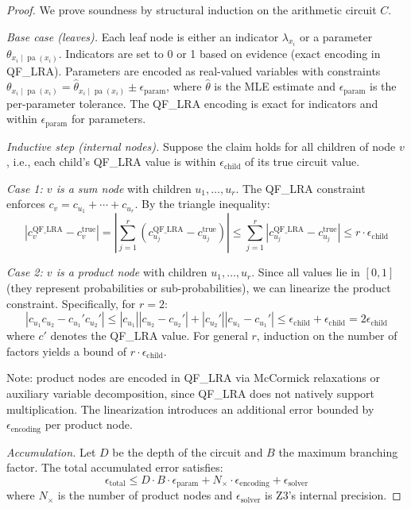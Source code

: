 \documentclass[11pt]{article}
\DeclareMathOperator{\pa}{pa}
\begin{document}
\begin{proof}
We prove soundness by structural induction on the arithmetic circuit $C$.

\emph{Base case (leaves).}
Each leaf node is either an indicator $\lambda_{x_i}$ or a parameter $\theta_{x_i \mid \pa(x_i)}$.
Indicators are set to 0 or 1 based on evidence (exact encoding in QF\_LRA).
Parameters are encoded as real-valued variables with constraints $\theta_{x_i \mid \pa(x_i)} = \hat{\theta}_{x_i \mid \pa(x_i)} \pm \epsilon_{\text{param}}$, where $\hat{\theta}$ is the MLE estimate and $\epsilon_{\text{param}}$ is the per-parameter tolerance.
The QF\_LRA encoding is exact for indicators and within $\epsilon_{\text{param}}$ for parameters.

\emph{Inductive step (internal nodes).}
Suppose the claim holds for all children of node $v$, i.e., each child's QF\_LRA value is within $\epsilon_{\text{child}}$ of its true circuit value.

\emph{Case 1: $v$ is a sum node} with children $u_1, \ldots, u_r$.
The QF\_LRA constraint enforces $c_v = c_{u_1} + \cdots + c_{u_r}$.
By the triangle inequality:
\[
  |c_v^{\text{QF\_LRA}} - c_v^{\text{true}}| = \left|\sum_{j=1}^r (c_{u_j}^{\text{QF\_LRA}} - c_{u_j}^{\text{true}})\right| \leq \sum_{j=1}^r |c_{u_j}^{\text{QF\_LRA}} - c_{u_j}^{\text{true}}| \leq r \cdot \epsilon_{\text{child}}
\]

\emph{Case 2: $v$ is a product node} with children $u_1, \ldots, u_r$.
Since all values lie in $[0,1]$ (they represent probabilities or sub-probabilities), we can linearize the product constraint.
Specifically, for $r = 2$:
\[
  |c_{u_1} c_{u_2} - c_{u_1}' c_{u_2}'| \leq |c_{u_1}||c_{u_2} - c_{u_2}'| + |c_{u_2}'||c_{u_1} - c_{u_1}'| \leq \epsilon_{\text{child}} + \epsilon_{\text{child}} = 2\epsilon_{\text{child}}
\]
where $c' $ denotes the QF\_LRA value.
For general $r$, induction on the number of factors yields a bound of $r \cdot \epsilon_{\text{child}}$.

Note: product nodes are encoded in QF\_LRA via McCormick relaxations or auxiliary variable decomposition, since QF\_LRA does not natively support multiplication.
The linearization introduces an additional error bounded by $\epsilon_{\text{encoding}}$ per product node.

\emph{Accumulation.}
Let $D$ be the depth of the circuit and $B$ the maximum branching factor.
The total accumulated error satisfies:
\[
  \epsilon_{\text{total}} \leq D \cdot B \cdot \epsilon_{\text{param}} + N_{\times} \cdot \epsilon_{\text{encoding}} + \epsilon_{\text{solver}}
\]
where $N_{\times}$ is the number of product nodes and $\epsilon_{\text{solver}}$ is Z3's internal precision.


\end{proof}
\end{document}
